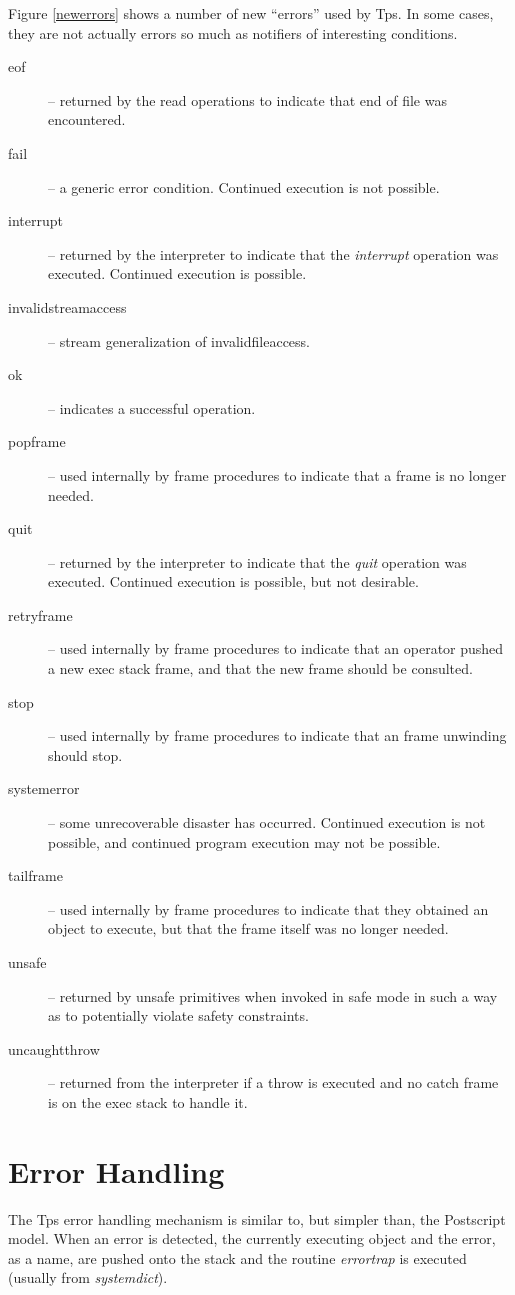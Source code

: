 Figure \ref{newerrors} shows
a number of new ``errors'' used by Tps.
In some cases, they are not actually errors so much
as notifiers of interesting conditions.
\begin{description}
\item[eof] -- returned by the read operations to indicate
that end of file was encountered.
\item[fail] -- a generic error condition.
Continued execution is not possible.
\item[interrupt] -- returned by the interpreter to indicate
that the {\em interrupt} operation was executed.
Continued execution is possible.
\item[invalidstreamaccess] -- stream generalization of invalidfileaccess.
\item[ok] -- indicates a successful operation.
\item[popframe] -- used internally by frame procedures
to indicate that a frame is no longer needed.
\item[quit]  -- returned by the interpreter to indicate
that the {\em quit} operation was executed.
Continued execution is possible, but not desirable.
\item[retryframe] -- used internally by frame procedures
to indicate that an operator pushed a new exec stack frame,
and that the new frame should be consulted.
\item[stop] -- used internally by frame procedures
to indicate that an frame unwinding should stop.
\item[systemerror] -- some unrecoverable disaster has occurred.
Continued execution is not possible, and continued program execution
may not be possible.
\item[tailframe] -- used internally by frame procedures
to indicate that they obtained an object to execute,
but that the frame itself was no longer needed.
\item[unsafe] -- returned by unsafe primitives
when invoked in safe mode in such a way as to potentially
violate safety constraints.
\item[uncaughtthrow] -- returned from the interpreter
if a throw is executed and no catch frame is on the exec stack
to handle it.
\end{description}

\section{Error Handling}
\label{errhandle}
The Tps error handling mechanism is similar to, but simpler than,
the Postscript model.
When an error is detected, the currently executing object and the
error, as a name, are pushed onto the stack and the routine
{\em errortrap} is executed (usually from {\em systemdict}).

